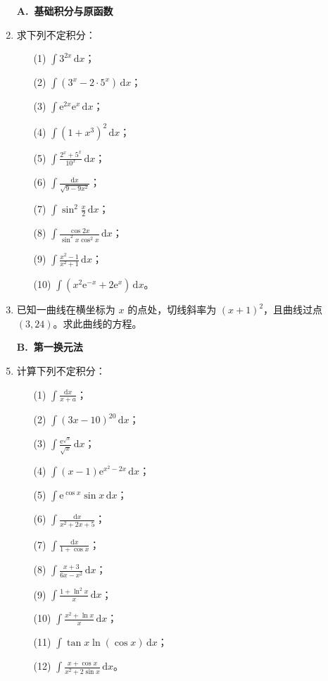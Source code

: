 \documentclass[fontset=fandol]{ctexart}
\newcommand{\dd}{\mathrm{d}}
\newcommand{\ee}{\mathrm{e}}
\begin{document}
\begin{enumerate}
\item[]\textbf{A.\ 基础积分与原函数}
\item 求下列不定积分：
\begin{enumerate}
\item[(1)] $\displaystyle \int 3^{2x}\,\dd x$；
\item[(2)] $\displaystyle \int (3^x-2\cdot5^x)\,\dd x$；
\item[(3)] $\displaystyle \int \ee^{2x}\ee^x\,\dd x$；
\item[(4)] $\displaystyle \int (1+x^3)^2\,\dd x$；
\item[(5)] $\displaystyle \int \frac{2^x+5^x}{10^x}\,\dd x$；
\item[(6)] $\displaystyle \int \frac{\dd x}{\sqrt{9-9x^2}}$；
\item[(7)] $\displaystyle \int \sin^2\frac{x}{2}\,\dd x$；
\item[(8)] $\displaystyle \int \frac{\cos2x}{\sin^2x\cos^2x}\,\dd x$；
\item[(9)] $\displaystyle \int \frac{x^2-1}{x^2+1}\,\dd x$；
\item[(10)] $\displaystyle \int (x^2\ee^{-x}+2\ee^x)\,\dd x$。
\end{enumerate}

\item 已知一曲线在横坐标为 $x$ 的点处，切线斜率为 $(x+1)^2$，且曲线过点 $(3,24)$。求此曲线的方程。

\item[]\textbf{B.\ 第一换元法}
\setcounter{enumi}{0}
\item 计算下列不定积分：
\begin{enumerate}
\item[(1)] $\displaystyle \int \frac{\dd x}{x+a}$；
\item[(2)] $\displaystyle \int (3x-10)^{20}\,\dd x$；
\item[(3)] $\displaystyle \int \frac{\ee^{\sqrt{x}}}{\sqrt{x}}\,\dd x$；
\item[(4)] $\displaystyle \int (x-1)\ee^{x^2-2x}\,\dd x$；
\item[(5)] $\displaystyle \int \ee^{\cos x}\sin x\,\dd x$；
\item[(6)] $\displaystyle \int \frac{\dd x}{x^2+2x+5}$；
\item[(7)] $\displaystyle \int \frac{\dd x}{1+\cos x}$；
\item[(8)] $\displaystyle \int \frac{x+3}{6x-x^2}\,\dd x$；
\item[(9)] $\displaystyle \int \frac{1+\ln^2x}{x}\,\dd x$；
\item[(10)] $\displaystyle \int \frac{x^2+\ln x}{x}\,\dd x$；
\item[(11)] $\displaystyle \int \tan x\ln(\cos x)\,\dd x$；
\item[(12)] $\displaystyle \int \frac{x+\cos x}{x^2+2\sin x}\,\dd x$。
\end{enumerate}


\end{enumerate}
\end{document}
